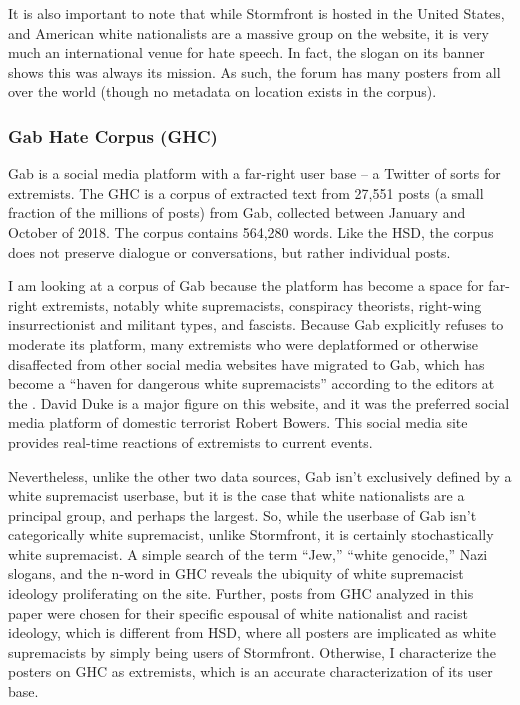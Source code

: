 \documentclass[output=paper,colorlinks,citecolor=brown]{langscibook}
\begin{document}
It is also important to note that while Stormfront is hosted in the United States, and American white nationalists are a massive group on the website, it is very much an international venue for hate speech. In fact, the slogan on its banner shows this was always its mission. As such, the forum has many posters from all over the world (though no metadata on location exists in the corpus).


\subsubsection{Gab Hate Corpus (GHC)}

Gab is a social media platform with a far-right user base -- a Twitter of sorts for extremists. The GHC is a corpus of extracted text from 27,551 posts (a small fraction of the millions of posts) from Gab,
collected between January and October of 2018. The corpus contains 564,280 words. Like the HSD, the corpus does not preserve dialogue or conversations, but rather individual posts.

I am looking at a corpus of Gab because the platform has become a space for far-right extremists, notably white supremacists, conspiracy theorists, right-wing insurrectionist and militant types, and fascists. Because Gab explicitly refuses to moderate its platform, many extremists who were deplatformed or otherwise disaffected from other social media websites have migrated to Gab, which has become a ``haven for dangerous white supremacists'' according to the editors at the \citet{jp:SouthernPovertyLawCenter2019}. David Duke is a major figure on this website, and it was the preferred social media platform of domestic terrorist Robert Bowers. This social media site provides real-time reactions of extremists to current events.

Nevertheless, unlike the other two data sources, Gab isn't exclusively defined by a white supremacist userbase, but it is the case that white nationalists are a principal group, and perhaps the largest. So, while the userbase of Gab isn't categorically white supremacist, unlike Stormfront, it is certainly stochastically white supremacist. A simple search of the term “Jew,” “white genocide,” Nazi slogans, and the n-word in GHC reveals the ubiquity of white supremacist ideology proliferating on the site. Further, posts from GHC analyzed in this paper were chosen for their specific espousal of white nationalist and racist ideology, which is different from HSD, where all posters are implicated as white supremacists by simply being users of Stormfront. Otherwise, I characterize the posters on GHC as extremists, which is an accurate characterization of its user base.
\end{document}
